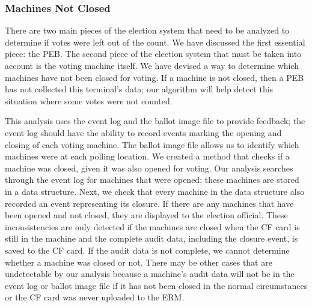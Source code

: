 \subsubsection{Machines Not Closed}
There are two main pieces of the election system that need to be analyzed to determine if votes were left out of the count.  We have discussed the first essential piece: the PEB.  The second piece of the election system that must be taken into account is the voting machine itself.   We have devised a way to determine which machines have not been closed for voting.  If a machine is not closed, then a PEB has not collected this terminal's data; our algorithm will help detect this situation where some votes were not counted.  

This analysis uses the event log and the ballot image file to provide feedback; the event log should have the ability to record events marking the opening and closing of each voting machine.  The ballot image file allows us to identify which machines were at each polling location.  We created a method that checks if a machine was closed, given it was also opened for voting.  Our analysis searches through the event log for machines that were opened; these machines are stored in a data structure.  Next, we check that every machine in the data structure also recorded an event representing its closure.  If there are any machines that have been opened and not closed, they are displayed to the election official.  These inconsistencies are only detected if the machines are closed when the CF card is still in the machine and the complete audit data, including the closure event, is saved to the CF card.  If the audit data is not complete, we cannot determine whether a machine was closed or not.  There may be other cases that are undetectable by our analysis because a machine's audit data will not be in the event log or ballot image file if it has not been closed in the normal circumstances or the CF card was never uploaded to the ERM. 
